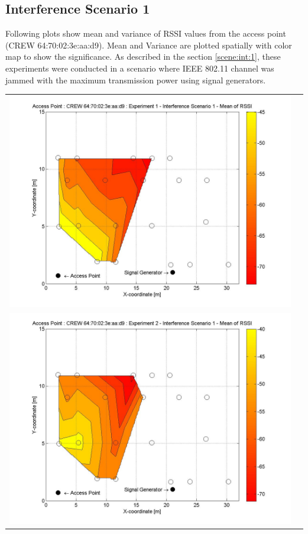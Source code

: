 \documentclass[11pt,a4paper,headinclude,footinclude,chapterprefix=on]{scrreprt}
\begin{document}
\subsection{Interference Scenario 1} 
Following plots show mean and variance of RSSI values from the access point (CREW 64:70:02:3e:aa:d9). Mean and Variance are plotted spatially with color map to show the significance. As described in the section \ref{scene:int:1}, these experiments were conducted in a scenario where IEEE 802.11 channel was jammed with the maximum transmission power using signal generators.
\begin{longtable}
	{lr} 
	\includegraphics[width=13cm]{../../Source/plot/CREW_d9/d9_Sig_Ex_1_Mean.jpg} \\
	\includegraphics[width=13cm]{../../Source/plot/CREW_d9/d9_Sig_Ex_2_Mean.jpg} \\

\end{longtable}
\end{document}

